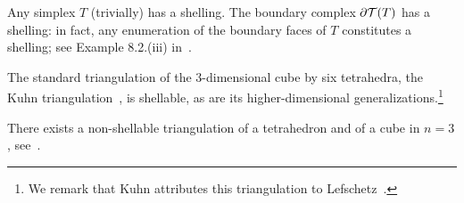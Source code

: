 \documentclass[10pt,letterpaper]{article}
\newcommand{\mwl}[1]{{\color{red}#1}}
\begin{document}
\begin{example}\label{example:shell_simpl}
    Any simplex $T$ (trivially) has a shelling. The boundary complex $\partial {\mathcal T}(T)$ has a shelling:
    in fact, any enumeration of the boundary faces of $T$ constitutes a shelling\mwl{; see Example 8.2.(iii) in~\cite{ziegler1995lectures}}.
\end{example}
\begin{example}
    The standard triangulation of the $3$-dimensional cube by six tetrahedra, the Kuhn triangulation~\cite{kuhn1960some}, is shellable, as are its higher-dimensional generalizations.\footnote{We remark that Kuhn attributes this triangulation to Lefschetz~\cite{lefschetz2015introduction}.}
\end{example}
\begin{example}
    There exists a non-shellable triangulation of a tetrahedron and of a cube in $n=3$, see~\cite[Example 8.9]{ziegler1995lectures}.
\end{example}
\end{document}
